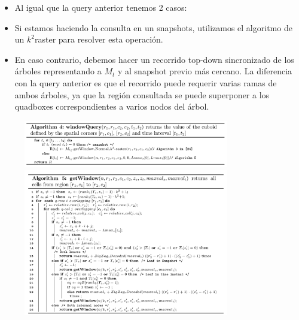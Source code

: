 \documentclass{article}
\begin{document}
\begin{itemize}
  \item Al igual que la query anterior tenemos 2 casos:
    \item Si estamos haciendo la consulta en un snapshots, utilizamos el
      algoritmo de un $k^2$raster para resolver esta operación.
    \item En caso contrario, debemos hacer un recorrido top-down sincronizado
      de los árboles representando a $M_t$ y al snapshot previo más cercano.
      La diferencia con la query anterior es que el recorrido puede requerir
      varias ramas de ambos árboles, ya que la región consultada se puede
      superponer a los quadboxes correspondientes a varios nodos del árbol.
\end{itemize}
\begin{figure}[h]
  \centering
  \includegraphics[width=0.8\textwidth]{../images/al4.png}
  \includegraphics[width=0.8\textwidth]{../images/al5.png}
\end{figure}

\clearpage
\end{document}
